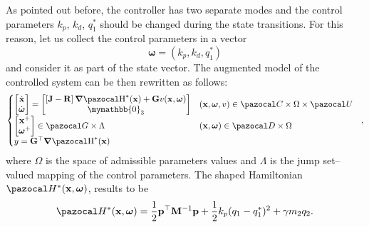 As pointed out before, the controller has two separate modes and the control parameters $k_p$, $k_d$, $q_1^*$ should be changed during the state transitions.
% 
For this reason, let us collect the control parameters in a vector 
%
\begin{equation}
    \bm\omega = (k_p,k_d,q_1^*)
\end{equation}
%
and consider it as part of the state vector. The augmented model of the controlled system can be then rewritten as follows:
\begin{equation}\label{eq:HpHc}
    \left\{ 
        \begin{matrix*}[l]\vspace{1pt}
            \begin{bmatrix}\dot{\xb}\\\dot{\bm\omega}\end{bmatrix} = \begin{bmatrix}\left[\Jb-\Rb\right]{\dH^*(\xb)}+\Gb v(\x,\bm\omega)\\\mymathbb{0}_3\end{bmatrix} &(\xb,\bm\omega,v)\in\C\times\Omega\times\U\\
            \begin{bmatrix}{\xb}^+\\{\bm\omega}^+\end{bmatrix} \in \G\times\Lambda&(\xb,\bm\omega)\in\D\times\Omega\\
            y = \Gb^\top{\dH^*(\xb)}
        \end{matrix*}
    \right.~~,
\end{equation}
%
where $\Omega$ is the space of admissible parameters values and $\Lambda$ is the jump set--valued mapping of the control parameters. The shaped Hamiltonian $\Ha^*(\xb,\bm\omega)$, results to be
%
\begin{equation}
	\Ha^*(\xb,\bm\omega) = \frac{1}{2}\pb^\top \Mb^{-1}\pb + \frac{1}{2}k_p(q_1 - q_1^*)^2+ \gamma m_2q_2.
\end{equation}
%

